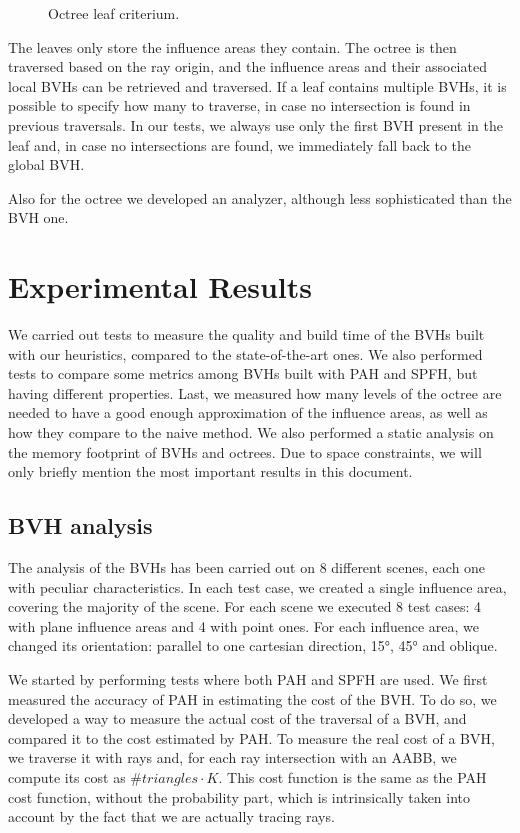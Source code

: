 \documentclass[11pt,a4paper,twocolumn]{article}
\begin{document}
\begin{figure}[H]
{    }
    \caption{Octree leaf criterium.}
    \label{fig:leaves}
\end{figure}

The leaves only store the influence areas they contain. The octree is then traversed based on the ray origin, and the influence areas and their associated local BVHs can be retrieved and traversed. If a leaf contains multiple BVHs, it is possible to specify how many to traverse, in case no intersection is found in previous traversals. In our tests, we always use only the first BVH present in the leaf and, in case no intersections are found, we immediately fall back to the global BVH.

Also for the octree we developed an analyzer, although less sophisticated than the BVH one.

\section{Experimental Results}
We carried out tests to measure the quality and build time of the BVHs built with our heuristics, compared to the state-of-the-art ones. We also performed tests to compare some metrics among BVHs built with PAH and SPFH, but having different properties. Last, we measured how many levels of the octree are needed to have a good enough approximation of the influence areas, as well as how they compare to the naive method. We also performed a static analysis on the memory footprint of BVHs and octrees. Due to space constraints, we will only briefly mention the most important results in this document.

\subsection{BVH analysis}
The analysis of the BVHs has been carried out on 8 different scenes, each one with peculiar characteristics. In each test case, we created a single influence area, covering the majority of the scene. For each scene we executed 8 test cases: 4 with plane influence areas and 4 with point ones. For each influence area, we changed its orientation: parallel to one cartesian direction, 15°, 45° and oblique.

We started by performing tests where both PAH and SPFH are used. We first measured the accuracy of PAH in estimating the cost of the BVH. To do so, we developed a way to measure the actual cost of the traversal of a BVH, and compared it to the cost estimated by PAH. To measure the real cost of a BVH, we traverse it with rays and, for each ray intersection with an AABB, we compute its cost as $\#triangles \cdot K$. This cost function is the same as the PAH cost function, without the probability part, which is intrinsically taken into account by the fact that we are actually tracing rays.
\end{document}
